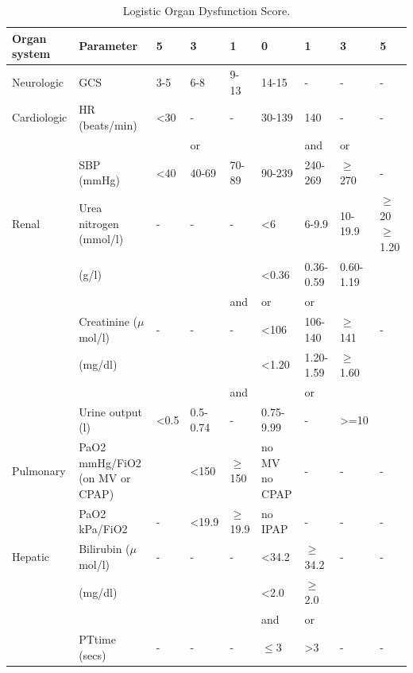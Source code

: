 \documentclass[12pt,a4paper,english
]{tunithesis}
\begin{document}
\begin{landscape}
    \begin{table}[]
    \begin{threeparttable}
        \caption{Logistic Organ Dysfunction Score.}
        \label{table:lods}
        \begin{tabular}{lllllllll}
            \hline
            \textbf{Organ system} & \textbf{Parameter} & \textbf{5} & \textbf{3} & \textbf{1} & \textbf{0} & \textbf{1} & \textbf{3} & \textbf{5} \\
            \hline
            Neurologic & GCS\tnote{1} & 3-5 & 6-8 & 9-13 & 14-15 & - & - & - \\
            Cardiologic & HR\tnote{2} (beats/min) & \textless 30 & - & - & 30-139 & 140 & - & - \\
             &  &  & or &  &  & and & or &  \\
             & SBP\tnote{3} (mmHg) & \textless 40 & 40-69 & 70-89 & 90-239 & 240-269 & $\geq$270 & - \\
            Renal & Urea nitrogen (mmol/l) & - & - & - & \textless{}6 & 6-9.9 & 10-19.9 & $\geq$20 $\geq$ 1.20 \\
             & (g/l) &  &  &  & \textless{}0.36 & 0.36-0.59 & 0.60-1.19 &  \\
             &  &  &  & and & or & or &  &  \\
             & Creatinine ($\mu$mol/l) & - & - & - & \textless{}106 & 106-140 & $\geq$141 & - \\
             & (mg/dl) &  &  &  & \textless{}1.20 & 1.20-1.59 & $\geq$1.60 &  \\
             &  &  &  & and &  & or &  &  \\
             & Urine output (l) & \textless{}0.5 & 0.5-0.74 & - & 0.75-9.99 & - & \textgreater{}=10 &  \\
            Pulmonary & PaO2 mmHg/FiO2 (on MV or CPAP) &  & \textless{}150 & $\geq$150 & no MV no CPAP & - & - & - \\
             & PaO2 kPa/FiO2 & - & \textless{}19.9 & $\geq$19.9 & no IPAP & - & - & - \\
            Hepatic & Bilirubin ($\mu$mol/l) & - & - & - & \textless{}34.2 & $\geq$34.2 & - & - \\
             & (mg/dl) &  &  &  & \textless{}2.0 & $\geq$2.0 &  &  \\
             &  &  &  &  & and & or &  &  \\
             & PT\tnote{4}time (secs) & - & - & - & $\leq$3 & \textgreater{}3 & - & - \\

\end{tabular}
\end{threeparttable}
\end{table}
\end{landscape}
\end{document}

